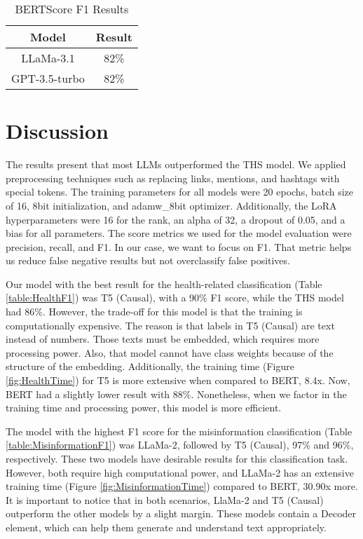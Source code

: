 \begin{table}[H]
	\centering
	\caption{BERTScore F1 Results}
	\begin{tabular}{||c | c||} 
		\hline
		\textbf{Model} & \textbf{Result} \\ [0.5ex] 
		\hline
		LLaMa-3.1 & 82\%  \\
		\hline
		GPT-3.5-turbo & 82\% \\ 		
		\hline
		\end{tabular}
	\label{table:BERTScore}
\end{table}



\section{Discussion}

The results present that most LLMs outperformed the THS model. We applied preprocessing techniques such as replacing links, mentions, and hashtags with special tokens. The training
parameters for all models were 20 epochs, batch size of 16, 8bit initialization, and adamw\_8bit optimizer. Additionally, the LoRA hyperparameters were 16 for the rank, an alpha of 32, a dropout
of 0.05, and a bias for all parameters. The score metrics we used for the model evaluation were precision, recall, and F1. In our case, we want to focus on F1. That metric helps us reduce false
negative results but not overclassify false positives.

Our model with the best result for the health-related classification (Table \ref{table:HealthF1}) was T5 (Causal), with a 90\% F1 score, while the THS model had 86\%. However, the trade-off
for this model is that the training is computationally expensive. The reason is that labels in T5 (Causal) are text instead of numbers. Those texts must be embedded, which requires more
processing power. Also, that model cannot have class weights because of the structure of the embedding. Additionally, the training time (Figure \ref{fig:HealthTime}) for T5 is more extensive
when compared to BERT, 8.4x. Now, BERT had a slightly lower result with 88\%. Nonetheless, when we factor in the training time and processing power, this model is more efficient.

The model with the highest F1 score for the misinformation classification (Table \ref{table:MisinformationF1}) was LLaMa-2, followed by T5 (Causal), 97\% and 96\%, respectively. These two models
have desirable results for this classification task. However, both require high computational power, and LLaMa-2 has an extensive training time (Figure \ref{fig:MisinformationTime}) compared to BERT,
30.90x more. It is important to notice that in both scenarios, LlaMa-2 and T5 (Causal) outperform the other models by a slight margin. These models contain a Decoder element, which can help them
generate and understand text appropriately.

